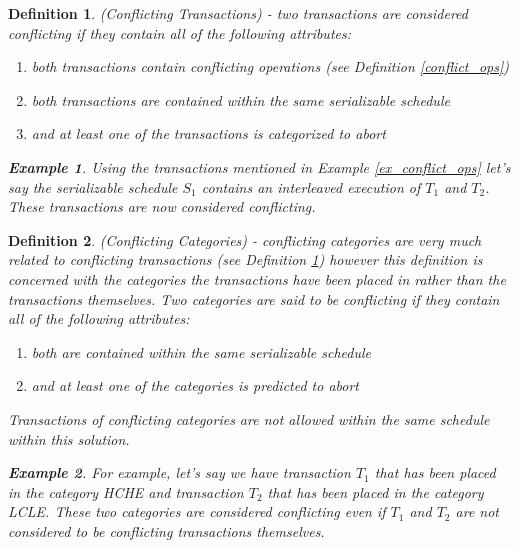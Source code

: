 \documentclass[conference]{IEEEtran}
\newtheorem{definition}{Definition}
\newtheorem{example}{Example}[definition]
\begin{document}
\begin{definition}
\label{conflict_trans}
 (Conflicting Transactions) - two transactions are considered conflicting if they contain all of the following attributes:
 
 \begin{enumerate}
 \item both transactions contain conflicting operations (see Definition \ref{conflict_ops})
 \item both transactions are contained within the same serializable schedule
 \item and at least one of the transactions is categorized to abort
 \end{enumerate}
 
 \begin{example}
 \label{ex_conflict_trans}
  Using the transactions mentioned in Example \ref{ex_conflict_ops} let's say the serializable schedule $S_{1}$ contains   an interleaved execution of $T_{1}$ and $T_{2}$. These transactions are now considered conflicting.
 \end{example}
\end{definition}

\begin{definition}
\label{conflict_cat}
  (Conflicting Categories) - conflicting categories are very much related to conflicting transactions (see Definition \ref{conflict_trans}) however this definition is concerned with the categories the transactions have been placed in rather than the transactions themselves. Two categories are said to be conflicting if they contain all of the following attributes:
  
  \begin{enumerate}
  \item both are contained within the same serializable schedule
  \item and at least one of the categories is predicted to abort
  \end{enumerate}
  
Transactions of conflicting categories are not allowed within the same schedule within this solution.  
  
  \begin{example}
  For example, let's say we have transaction $T_{1}$ that has been placed in the category HCHE and transaction $T_{2}$ that has been placed in the category LCLE. These two categories are considered conflicting even if $T_{1}$ and $T_{2}$ are not considered to be conflicting transactions themselves.
  \end{example}
  
\end{definition}
\end{document}

